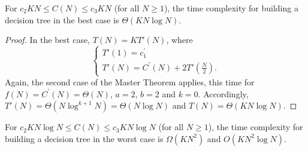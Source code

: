 \begin{theorem}\label{thm:6:best:kn}
For $c_2 K N \leq C(N) \leq c_3 K N$ (for all $N \geq 1$), the time complexity for building a decision
tree in the best case is $\Theta(K N \log N)$.
\end{theorem}

\begin{proof}
In the best case, $T(N) = K T'(N)$, where
\begin{equation}
\begin{cases}
T'(1) = c_1^\prime \\
T'(N) = C^\prime(N) + 2 T'(\frac{N}{2}).
\end{cases}
\end{equation}
Again, the second case of the Master Theorem applies, this time for $f(N)=C^\prime(N)=\Theta(N)$, $a=2$, $b=2$ and $k=0$.
Accordingly, $T'(N)=\Theta(N\log^{k+1} N)=\Theta(N\log N)$ and $T(N) = \Theta(K N\log N)$.
\end{proof}

\begin{theorem}\label{thm:6:worst:knlogn}
For $c_2 K N \log N \leq C(N)\leq c_3 K N\log N$ (for all $N \geq 1$), the time complexity for building a decision
tree in the worst case is $\Omega(K N^2)$ and $O(K N^2 \log N)$.
\end{theorem}

